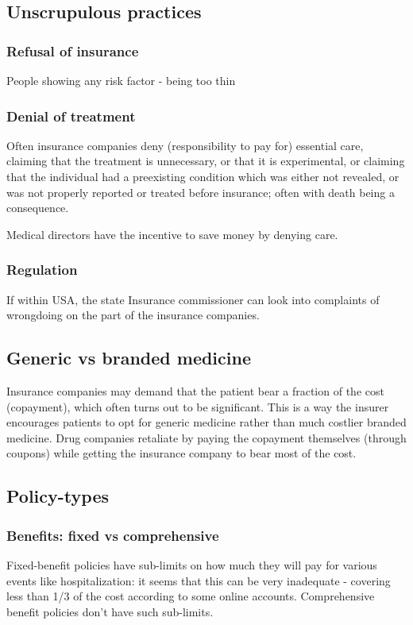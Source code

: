 \documentclass[oneside, article]{memoir}
\begin{document}
\subsection{Unscrupulous practices}
\subsubsection{Refusal of insurance}
People showing any risk factor - being too thin

\subsubsection{Denial of treatment}
Often insurance companies deny (responsibility to pay for) essential care, claiming that the treatment is unnecessary, or that it is experimental, or claiming that the individual had a preexisting condition which was either not revealed, or was not properly reported or treated before insurance; often with death being a consequence.

Medical directors have the incentive to save money by denying care.

\subsubsection{Regulation}
If within USA, the state Insurance commissioner can look into complaints of wrongdoing on the part of the insurance companies.

\subsection{Generic vs branded medicine}
Insurance companies may demand that the patient bear a fraction of the cost (copayment), which often turns out to be significant. This is a way the insurer encourages patients to opt for generic medicine rather than much costlier branded medicine. Drug companies retaliate by paying the copayment themselves (through coupons) while getting the insurance company to bear most of the cost.

\subsection{Policy-types}
\subsubsection{Benefits: fixed vs comprehensive}
Fixed-benefit policies have sub-limits on how much they will pay for various events like hospitalization: it seems that this can be very inadequate - covering less than 1/3 of the cost according to some online accounts. Comprehensive benefit policies don't have such sub-limits.
\end{document}
